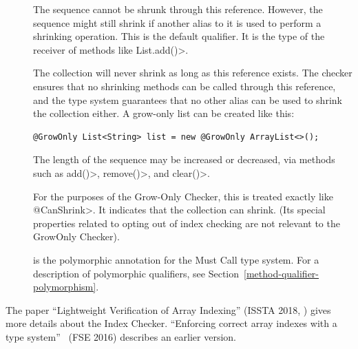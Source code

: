 \begin{description}
\item[]
  The sequence cannot be shrunk through this reference. However, the sequence
  might still shrink if another alias to it is used to perform a shrinking
  operation. This is the default qualifier.  It is the type of the receiver of
  methods like \<List.add()>.

\item[]
  The collection will never shrink as long as
  this reference exists. The checker ensures that no shrinking methods can be
  called through this reference, and the type system guarantees that no other
  alias can be used to shrink the collection either.  A grow-only list can be
  created like this:
\begin{Verbatim}
@GrowOnly List<String> list = new @GrowOnly ArrayList<>();
\end{Verbatim}

\item[]
  The length of the sequence may be increased or decreased, via methods such as
  \<add()>, \<remove()>, and \<clear()>.

\item[]
  For the purposes of the Grow-Only Checker, this is treated exactly like
  \<@CanShrink>. It indicates that the collection can shrink. (Its special
  properties related to opting out of index checking are not relevant to the
  GrowOnly Checker).

\item[]
  is the polymorphic annotation for the Must Call type system.
  For a description of polymorphic qualifiers, see
  Section~\ref{method-qualifier-polymorphism}.

\end{description}
\fi %


The paper ``Lightweight Verification of Array Indexing'' (ISSTA 2018,
)
gives more details about the Index Checker.
``Enforcing correct array indexes with a type system''~\cite{Santino2016} (FSE 2016) describes
an earlier version.


